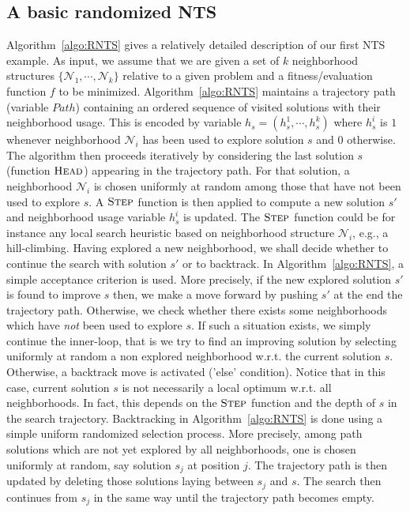 \documentclass{acm_proc_article-sp}
\newcommand{\m}[1]{\mathcal{#1}}
\begin{document}
\subsection{A basic randomized NTS}
Algorithm~\ref{algo:RNTS} gives a relatively detailed description of our first NTS example. As input, we assume that we are given a set of $k$ neighborhood structures $\{\m{N}_1, \cdots, \m{N}_k\}$ relative to a given problem and a fitness/evaluation function $f$ to be minimized. Algorithm~\ref{algo:RNTS} maintains a trajectory path (variable $Path$) containing an ordered sequence of visited solutions with their neighborhood usage. This is encoded by variable $h_s=(h_s^1, \cdots, h_s^k)$ where $h_s^i$ is $1$ whenever neighborhood $\m{N}_i$ has been used to explore solution $s$ and $0$ otherwise. The algorithm then proceeds iteratively by considering the last solution $s$ (function $\textsc{Head}$) appearing in the trajectory path. For that solution, a neighborhood $\m{N}_i$ is chosen uniformly at random among those that have not been used to explore $s$. A $\textsc{Step}$ function is then applied to compute a new solution $s'$ and neighborhood usage variable $h_s^i$ is updated. The $\textsc{Step}$ function could be for instance any local search heuristic based on neighborhood structure $\m{N}_i$, e.g., a hill-climbing. Having explored a new neighborhood, we shall decide whether to continue the search with solution $s'$ or to backtrack. In Algorithm~\ref{algo:RNTS}, a simple acceptance criterion is used. More precisely, if the new explored solution $s'$ is found to improve $s$ then, we make a move forward by pushing $s'$ at the end the trajectory path. Otherwise, we check whether there exists some neighborhoods which have \emph{not} been used to explore $s$. If such a situation exists, we simply continue the inner-loop, that is we try to find an improving solution by selecting uniformly at random a non explored neighborhood w.r.t. the current solution $s$. Otherwise, a backtrack move is activated ('else' condition). Notice that in this case, current solution $s$ is not necessarily a local optimum w.r.t. all neighborhoods. In fact, this depends on the $\textsc{Step}$ function and the depth of $s$ in the search trajectory. Backtracking in Algorithm~\ref{algo:RNTS} is done using a simple uniform randomized selection process. More precisely, among path solutions which are not yet explored by all neighborhoods, one is chosen uniformly at random, say solution $s_j$ at position $j$. The trajectory path is then updated by deleting those solutions laying between $s_j$ and $s$. The search then continues from $s_j$ in the same way until the trajectory path becomes empty.
\end{document}
